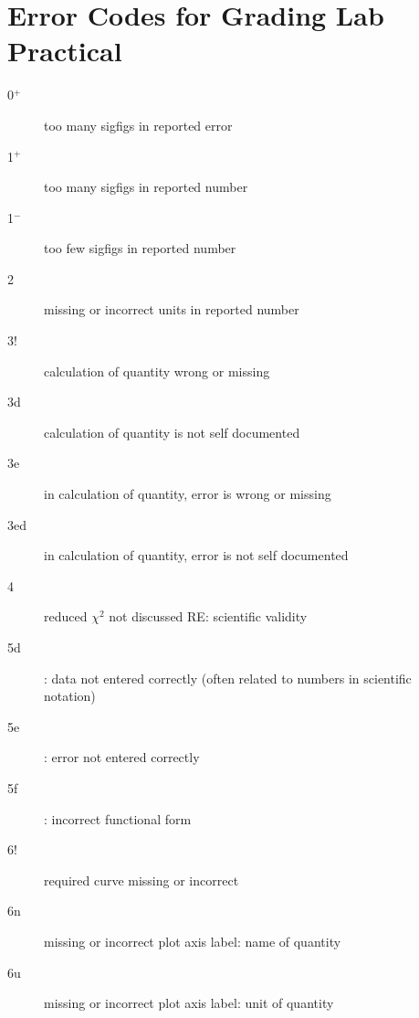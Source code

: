 \documentclass[10pt]{article}
\begin{document}
\section*{Error Codes for Grading Lab Practical}

\begin{description}
\item[0$^+$] too many sigfigs in reported error
\item[1$^+$] too many sigfigs in reported number
\item[1$^-$] too few sigfigs in reported number
\item[2] missing or incorrect units in reported number
\item[3!] calculation of quantity wrong or missing
\item[3d]  calculation of quantity is not self documented
\item[3e]  in calculation of quantity, error is wrong or missing
\item[3ed]  in calculation of quantity, error is not self documented
\item[4] reduced $\chi^2$ not discussed RE: scientific validity
\item[5d] \WAPP: data not entered correctly (often related to numbers in scientific notation)
\item[5e] \WAPP: error not entered correctly
\item[5f] \WAPP: incorrect functional form
\item[6!] required curve missing or incorrect
\item[6n] missing or incorrect plot axis label: name of quantity
\item[6u] missing or incorrect plot axis label: unit of quantity
\end{description}
\end{document}
